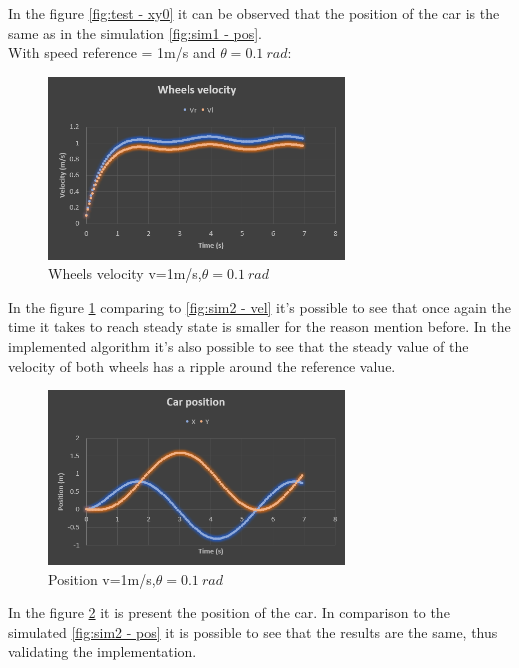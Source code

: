 In the figure \ref{fig:test - xy0} it can be observed that the position of the car is the same as in the simulation \ref{fig:sim1 - pos}.\\
With speed reference = 1m/s and $\theta = 0.1~\si{rad}$:\\
\begin{figure}[!h]
\centering
\includegraphics[width=0.7\textwidth]{./img/testv1t01.PNG}
\caption {\label{fig:test - vel01}Wheels velocity v=1m/s,$\theta = 0.1~\si{rad}$}
\end{figure}
In the figure \ref{fig:test - vel01} comparing to \ref{fig:sim2 - vel} it's possible to see that once again the time it takes to reach steady state is smaller for the reason mention before. In the implemented algorithm it's also possible to see that the steady value of the velocity of both wheels has a ripple around the reference value. \\
\begin{figure}[!h]
\centering
\includegraphics[width=0.7\textwidth]{./img/testx1t01.PNG}
\caption {\label{fig:test - xy01}Position v=1m/s,$\theta = 0.1~\si{rad}$}
\end{figure}
In the figure \ref{fig:test - xy01} it is present the position of the car. In comparison to the simulated \ref{fig:sim2 - pos} it is possible to see that the results are the same, thus validating the implementation.\\
